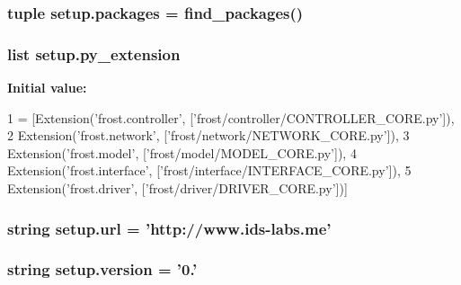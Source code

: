 \subsubsection[{packages}]{\setlength{\rightskip}{0pt plus 5cm}tuple setup.\+packages = find\+\_\+packages()}\label{namespacesetup_a61c4df0a151113447498726d453324de}
\hypertarget{namespacesetup_af0c0e6d309529d5ba05aa1b7bf922b4f}{}
\subsubsection[{py\+\_\+extension}]{\setlength{\rightskip}{0pt plus 5cm}list setup.\+py\+\_\+extension}\label{namespacesetup_af0c0e6d309529d5ba05aa1b7bf922b4f}
{\bfseries Initial value\+:}
\begin{DoxyCode}
1 = [Extension(\textcolor{stringliteral}{'frost.controller'}, [\textcolor{stringliteral}{'frost/controller/CONTROLLER\_CORE.py'}]), 
2                           Extension(\textcolor{stringliteral}{'frost.network'}, [\textcolor{stringliteral}{'frost/network/NETWORK\_CORE.py'}]),
3                           Extension(\textcolor{stringliteral}{'frost.model'}, [\textcolor{stringliteral}{'frost/model/MODEL\_CORE.py'}]),
4                           Extension(\textcolor{stringliteral}{'frost.interface'}, [\textcolor{stringliteral}{'frost/interface/INTERFACE\_CORE.py'}]),
5                           Extension(\textcolor{stringliteral}{'frost.driver'}, [\textcolor{stringliteral}{'frost/driver/DRIVER\_CORE.py'}])]
\end{DoxyCode}
\hypertarget{namespacesetup_a7c3763764f99123690822c047e74c36e}{}
\subsubsection[{url}]{\setlength{\rightskip}{0pt plus 5cm}string setup.\+url = 'http\+://www.\+ids-\/labs.\+me'}\label{namespacesetup_a7c3763764f99123690822c047e74c36e}
\hypertarget{namespacesetup_a8b86ddd5b5591d99de08e584197a53d9}{}
\subsubsection[{version}]{\setlength{\rightskip}{0pt plus 5cm}string setup.\+version = '0.'}\label{namespacesetup_a8b86ddd5b5591d99de08e584197a53d9}
